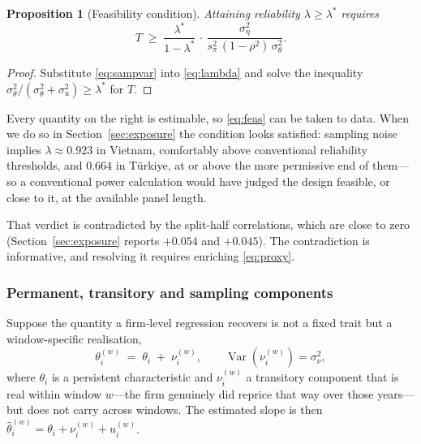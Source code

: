 \documentclass[review,12pt,authoryear]{elsarticle}
\theoremstyle{plain}
\newtheorem{proposition}{Proposition}
\theoremstyle{definition}
\newcommand{\Var}{\operatorname{Var}}
\begin{document}
\begin{proposition}[Feasibility condition]
\label{prop:feas}
Attaining reliability $\lambda\ge\lambda^{*}$ requires
\begin{equation}
T \;\ge\; \frac{\lambda^{*}}{1-\lambda^{*}}\,
\cdot\,\frac{\sigma^2_\eta}{s^2_\pi\,(1-\rho^2)\,\sigma^2_\theta}.
\label{eq:feas}
\end{equation}
\end{proposition}

\begin{proof}
Substitute \eqref{eq:sampvar} into \eqref{eq:lambda} and solve the inequality
$\sigma^2_\theta/(\sigma^2_\theta+\sigma^2_u)\ge\lambda^{*}$ for $T$.
\end{proof}

Every quantity on the right is estimable, so \eqref{eq:feas} can be taken to
data. When we do so in Section~\ref{sec:exposure} the condition looks
satisfied: sampling noise implies $\lambda\approx0.923$ in Vietnam, comfortably
above conventional reliability thresholds, and $0.664$ in T\"{u}rkiye, at or
above the more permissive end of them---so a conventional power calculation
would have judged the design feasible, or close to it, at the available panel
length.

That verdict is contradicted by the split-half correlations, which are close to
zero (Section~\ref{sec:exposure} reports $+0.054$ and $+0.045$). The
contradiction is informative, and resolving it requires enriching
\eqref{eq:proxy}.

\subsubsection{Permanent, transitory and sampling components}

Suppose the quantity a firm-level regression recovers is not a fixed trait but a
window-specific realisation,
\begin{equation}
\theta_{i}^{(w)} \;=\; \theta_i \;+\; \nu_i^{(w)},
\qquad \Var(\nu^{(w)}_i)=\sigma^2_\nu,
\label{eq:transitory}
\end{equation}
where $\theta_i$ is a persistent characteristic and $\nu^{(w)}_i$ a transitory
component that is real within window $w$---the firm genuinely did reprice that
way over those years---but does not carry across windows. The estimated slope is
then $\widehat{\theta}^{(w)}_i=\theta_i+\nu^{(w)}_i+u^{(w)}_i$.
\end{document}
